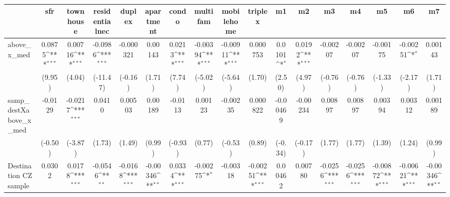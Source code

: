 \begin{table}[htbp]\centering
\def\sym#1{\ifmmode^{#1}\else\(^{#1}\)\fi}
\caption{ \label{tab1}}
\begin{tabular}{l*{16}{c}}
\toprule
                    &\multicolumn{1}{c}{sfr}&\multicolumn{1}{c}{townhouse}&\multicolumn{1}{c}{residentialnec}&\multicolumn{1}{c}{duplex}&\multicolumn{1}{c}{apartment}&\multicolumn{1}{c}{condo}&\multicolumn{1}{c}{multifam}&\multicolumn{1}{c}{mobilehome}&\multicolumn{1}{c}{triplex}&\multicolumn{1}{c}{m1}&\multicolumn{1}{c}{m2}&\multicolumn{1}{c}{m3}&\multicolumn{1}{c}{m4}&\multicolumn{1}{c}{m5}&\multicolumn{1}{c}{m6}&\multicolumn{1}{c}{m7}\\
\midrule
above\_x\_med         &      0.0875\sym{***}&     0.00716\sym{***}&     -0.0986\sym{***}&   -0.000321         &     0.00143         &      0.0213\sym{***}&    -0.00394\sym{***}&    -0.00911\sym{***}&    0.000753         &      0.0101\sym{*}  &      0.0192\sym{***}&    -0.00207         &    -0.00207         &    -0.00175         &    -0.00251\sym{*}  &     0.00143         \\
                    &      (9.95)         &      (4.04)         &    (-11.47)         &     (-0.16)         &      (1.71)         &      (7.74)         &     (-5.02)         &     (-5.64)         &      (1.70)         &      (2.50)         &      (4.97)         &     (-0.76)         &     (-0.76)         &     (-1.33)         &     (-2.17)         &      (1.71)         \\
\addlinespace
samp\_destXabove\_x\_med&     -0.0129         &     -0.0217\sym{***}&      0.0410         &     0.00503         &     0.00189         &     -0.0113         &     0.00123         &    -0.00235         &    0.000822         &    -0.00469         &    -0.00234         &     0.00897         &     0.00897         &     0.00394         &     0.00312         &     0.00189         \\
                    &     (-0.50)         &     (-3.87)         &      (1.73)         &      (1.49)         &      (0.99)         &     (-0.93)         &      (0.77)         &     (-0.53)         &      (0.89)         &     (-0.34)         &     (-0.17)         &      (1.77)         &      (1.77)         &      (1.39)         &      (1.24)         &      (0.99)         \\
\addlinespace
Destination CZ sample&      0.0302         &      0.0178\sym{***}&     -0.0546\sym{**} &     -0.0168\sym{***}&    -0.00346\sym{**} &      0.0334\sym{***}&    -0.00275\sym{*}  &    -0.00318         &    -0.00251\sym{***}&     0.00462         &     0.00780         &     -0.0256\sym{***}&     -0.0256\sym{***}&    -0.00872\sym{***}&    -0.00621\sym{***}&    -0.00346\sym{**} \\

\end{tabular}
\end{table}
